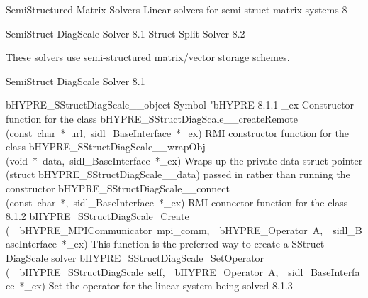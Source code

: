 \documentclass{article}
\begin{document}
\begin{cxxentry}
{}
        {SemiStructured Matrix Solvers}
        {}
        {Linear solvers for semi-struct matrix systems}
        {8}
\begin{cxxnames}
\cxxitem{}
        {SemiStruct DiagScale Solver}
        {}
        {
}
        {8.1}
\cxxitem{}
        {Struct Split Solver}
        {}
        {
}
        {8.2}
\end{cxxnames}
\begin{cxxdoc}


These solvers use semi-structured matrix/vector storage schemes.


\end{cxxdoc}
\begin{cxxentry}
{}
        {SemiStruct DiagScale Solver}
        {}
        {
}
        {8.1}
\begin{cxxnames}
        {bHYPRE\_SStructDiagScale\_\_object}
        {}
        {
Symbol "bHYPRE}
        {8.1.1}
        {\_ex}
        {}
        {
Constructor function for the class}
        {}
\label{cxx.8.1.11}
        {bHYPRE\_SStructDiagScale\_\_createRemote}
        {(const\ char\ *\ url,\ sidl\_BaseInterface\ *\_ex)}
        {
RMI constructor function for the class}
        {}
\label{cxx.8.1.12}
        {bHYPRE\_SStructDiagScale\_\_wrapObj}
        {(void\ *\ data,\ sidl\_BaseInterface\ *\_ex)}
        {
Wraps up the private data struct pointer (struct bHYPRE\_SStructDiagScale\_\_data) passed in rather than running the constructor}
        {}
\label{cxx.8.1.13}
        {bHYPRE\_SStructDiagScale\_\_connect}
        {(const\ char\ *,\ sidl\_BaseInterface\ *\_ex)}
        {
RMI connector function for the class}
        {8.1.2}
        {bHYPRE\_SStructDiagScale\_Create}
        {(\ \ bHYPRE\_MPICommunicator\ mpi\_comm,\ \ bHYPRE\_Operator\ A,\ \ sidl\_BaseInterface\ *\_ex)}
        {
This function is the preferred way to create a SStruct DiagScale solver}
        {}
\label{cxx.8.1.14}
        {bHYPRE\_SStructDiagScale\_SetOperator}
        {(\ \ bHYPRE\_SStructDiagScale\ self,\ \ bHYPRE\_Operator\ A,\ \ sidl\_BaseInterface\ *\_ex)}
        {
Set the operator for the linear system being solved}
        {8.1.3}

\end{cxxnames}
\end{cxxentry}
\end{cxxentry}
\end{document}
